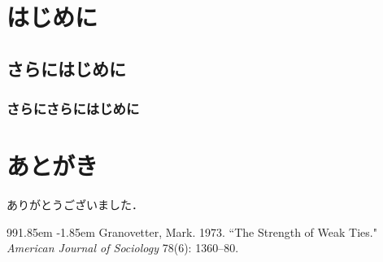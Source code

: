 \documentclass[a4paper,10pt,oneside,openany,uplatex]{jsbook}
\begin{document}
\chapter{はじめに}
\section{さらにはじめに}
\subsection{さらにさらにはじめに}

 \backmatter
\chapter{あとがき}
ありがとうございました．

\def\bibindent{1.85em}
\begin{thebibliography}{99\kern\bibindent}
\makeatletter
\def\@biblabel#1{}
\let\old@bibitem\bibitem
\def\bibitem#1{\old@bibitem{#1}\leavevmode\kern-\bibindent}
\makeatother
\small
\bibitem{}
Granovetter, Mark. 1973. ``The Strength of Weak Ties." \textit{American Journal of Sociology} 78(6): 1360--80.
\end{thebibliography}
\end{document}
